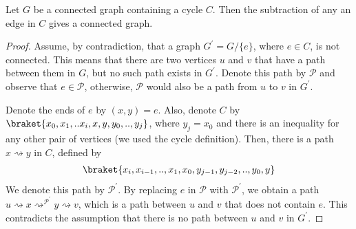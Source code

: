 \begin{claim}
  Let $G$ be a connected graph containing a cycle $C$. Then the subtraction of any an edge in $C$ gives a connected graph. 
\end{claim}
\begin{proof}
Assume, by contradiction, that a graph $G^{\prime} = G / \{ e \} $, where $e \in C$, is not connected. This means that there are two vertices $u$ and $v$ that have a path between them in $G$, but no such path exists in $G^{\prime}$. Denote this path by $\mathcal{P}$ and observe that $e \in \mathcal{P}$, otherwise, $\mathcal{P}$ would also be a path from $u$ to $v$ in $G^{\prime}$.

Denote the ends of $e$ by $(x,y)=e$. Also, denote $C$ by $\braket{x_{0},x_{1},..x_{i},x,y,y_{0},..,y_{j}}$, where $y_{j}=x_{0}$ and there is an inequality for any other pair of vertices (we used the cycle definition). Then, there is a path $x \rightsquigarrow y$ in $C$, defined by 
\begin{equation*}
  \begin{split}
\braket{x_{i},x_{i-1},..,x_{1},x_{0},y_{j-1},y_{j-2},..,y_{0},y}
  \end{split}
\end{equation*}
 We denote this path by $\mathcal{P}^{\prime}$. By replacing $e$ in $\mathcal{P}$ with $\mathcal{P}^{\prime}$, we obtain a path $u \rightsquigarrow x \rightsquigarrow^{\mathcal{P}^\prime} y \rightsquigarrow v$, which is a path between $u$ and $v$ that does not contain $e$. This contradicts the assumption that there is no path between $u$ and $v$ in $G^{\prime}$.
\end{proof}






